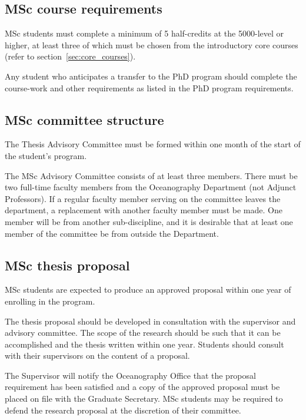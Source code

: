 \documentclass{article}
\begin{document}
\subsection{MSc course requirements}

MSc students must complete a minimum of 5 half-credits at the 5000-level or
        higher, at least three of which must be chosen from the introductory
        core courses (refer to section~\ref{sec:core_courses}).

Any student who anticipates a transfer to the PhD program should complete the
course-work and other requirements as listed in the PhD program requirements.

\subsection{MSc committee structure}

The Thesis Advisory Committee must be formed within one month of the start of
the student’s program.

The MSc Advisory Committee consists of at least three members. There must be
two full-time faculty members from the Oceanography Department (not Adjunct
Professors). If a regular faculty member serving on the committee leaves the
department, a replacement with another faculty member must be made. One member
will be from another sub-discipline, and it is desirable that at least one
member of the committee be from outside the Department.


\subsection{MSc thesis proposal}

MSc students are expected to produce an approved proposal within one year of
enrolling in the program.

The thesis proposal should be developed in consultation with the supervisor and
advisory committee. The scope of the research should be such that it can be
accomplished and the thesis written within one year. Students should consult
with their supervisors on the content of a proposal.

The Supervisor will notify the Oceanography Office that the proposal
requirement has been satisfied and a copy of the approved proposal must be
placed on file with the Graduate Secretary. MSc students may be required to
defend the research proposal at the discretion of their committee.
\end{document}
